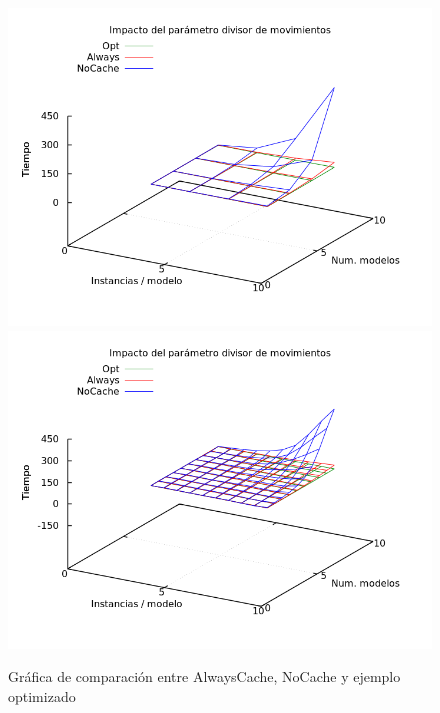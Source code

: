 \begin{figure}[H]
\centering
\includegraphics[scale=0.5]{img/comp-all}
\includegraphics[scale=0.5]{img/comp-all-spl}
\caption{Gráfica de comparación entre AlwaysCache, NoCache y ejemplo optimizado
\label{fig:grfcompall}}
\end{figure}



